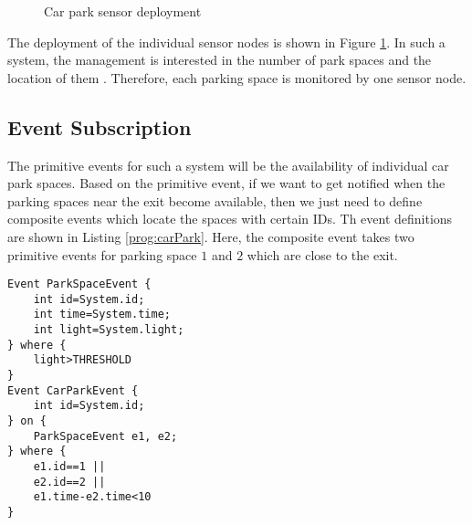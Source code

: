\begin{figure}
\centering
{}
\caption{Car park sensor deployment}
\label{fig:carParkDeployment}
\end{figure}

The deployment of the individual sensor nodes is shown in Figure \ref{fig:carParkDeployment}. In such a system, the management is interested in the number of park spaces and the location of them \cite{tang:carpark}. Therefore, each parking space is monitored by one sensor node.

\subsection{Event Subscription}
The primitive events for such a system will be the availability of individual car park spaces. Based on the primitive event, if we want to get notified when the parking spaces near the exit become available, then we just need to define composite events which locate the spaces with certain IDs. Th event definitions are shown in Listing \ref{prog:carPark}. Here, the composite event takes two primitive events for parking space \(1\) and \(2\) which are close to the exit.

\begin{lstlisting}[caption=Event definition for a car park, label=prog:carPark]
Event ParkSpaceEvent {
	int id=System.id;
	int time=System.time;
	int light=System.light;
} where {
	light>THRESHOLD
}
Event CarParkEvent {
	int id=System.id;
} on {
	ParkSpaceEvent e1, e2;
} where {
	e1.id==1 ||
	e2.id==2 ||
	e1.time-e2.time<10
}\end{lstlisting}
